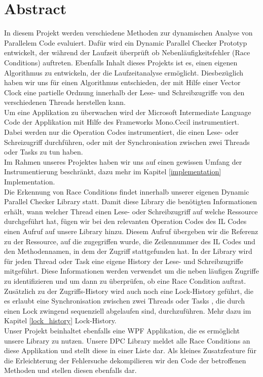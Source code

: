 \documentclass[10pt,a4paper]{article}
\begin{document}
\section{Abstract}
\begin{flushleft}
In diesem Projekt werden verschiedene Methoden zur dynamischen Analyse von Parallelem Code evaluiert. Dafür wird ein Dynamic Parallel Checker Prototyp entwickelt, der während der Laufzeit überprüft ob Nebenläufigkeitsfehler (Race Conditions) auftreten. Ebenfalls Inhalt dieses Projekts ist es, einen eigenen Algorithmus zu entwickeln, der die Laufzeitanalyse ermöglicht. Diesbezüglich haben wir uns für einen Algorithmus entschieden, der mit Hilfe einer Vector Clock eine partielle Ordnung innerhalb der Lese- und Schreibzugriffe von den verschiedenen Threads herstellen kann.\\
Um eine Applikation zu überwachen wird der Microsoft Intermediate Language Code der Applikation mit Hilfe des Frameworks Mono.Cecil instrumentiert. Dabei werden nur die Operation Codes instrumentiert, die einen Lese- oder Schreizugriff durchführen, oder mit der Synchronisation zwischen zwei Threads oder Tasks zu tun haben.\\
Im Rahmen unseres Projektes haben wir uns auf einen gewissen Umfang der Instrumentierung beschränkt, dazu mehr im Kapitel \ref{implementation} Implementation.\\
Die Erkennung von Race Conditions findet innerhalb unserer eigenen Dynamic Parallel Checker Library statt. Damit diese Library die benötigten Informationen erhält, wann welcher Thread einen Lese- oder Schreibzugriff auf welche Ressource durchgeführt hat, fügen wir bei den relevanten Operation Codes des IL Codes einen Aufruf auf unsere Library hinzu. 
Diesem Aufruf übergeben wir die Referenz zu der Ressource, auf die zugegriffen wurde, die Zeilennummer des IL Codes und den Methodennamen, in dem der Zugriff stattgefunden hat. In der Library wird für jeden Thread oder Task eine eigene History der Lese- und Schreibzugriffe mitgeführt. Diese Informationen werden verwendet um die neben läufigen Zugriffe zu identifizieren und um dann zu überprüfen, ob eine Race Condition auftrat. Zusätzlich zu der Zugriffs-History wird auch noch eine Lock-History geführt, die es erlaubt eine Synchronisation zwischen zwei Threads oder Tasks , die durch einen Lock zwingend sequenziell abgelaufen sind, durchzuführen. Mehr dazu im Kapitel \ref{lock_history} Lock-History.\\
Unser Projekt beinhaltet ebenfalls eine WPF Applikation, die es ermöglicht unsere Library zu nutzen. Unsere DPC Library meldet alle Race Conditions an diese Applikation und stellt diese in einer Liste dar. Als kleines Zusatzfeature für die Erleichterung der Fehlersuche dekompilieren wir den Code der betroffenen Methoden und stellen diesen ebenfalls dar.\\

\end{flushleft}
\end{document}
